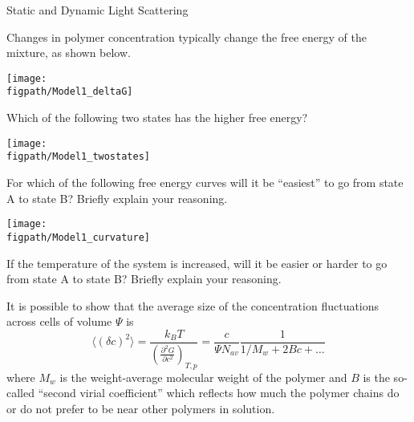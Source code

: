 \begin{activity}{Static and Dynamic Light Scattering}
\begin{model}
	\label{\labelbase:mdl:SLS}

Changes in polymer concentration typically change the free energy of the mixture, as shown below.
	
	\centerline{\texttt{[image: \\figpath/Model1\_deltaG]}}
	
\end{model}

\begin{ctqs}
	
		\question Which of the following two states has the higher free energy?
	
	\vspace{6pt}
	\centerline{\texttt{[image: \\figpath/Model1\_twostates]}}
	
			\begin{solution}[0.25in]{}
			\end{solution}
			
		\question For which of the following free energy curves will it be ``easiest'' to go from state A to state B?  Briefly explain your reasoning.  \label{\labelbase:ctq:delGcurvature}
	
	\centerline{\texttt{[image: \\figpath/Model1\_curvature]}}
	
			\begin{solution}[1in]{}
			\end{solution}
			
	\question If the temperature of the system is increased, will it be easier or harder to go from state A to state B?  Briefly explain your reasoning. \label{\labelbase:ctq:temperature}
	
			\begin{solution}[1in]{}
			\end{solution}
	
\end{ctqs}

\begin{infobox}
	It is possible to show that the average size of the concentration fluctuations across cells of volume $\Psi$ is
	\begin{equation*}
		\langle (\delta c)^2\rangle = \frac{k_BT}{\left( \frac{\partial^2 G}{\partial c^2}\right)_{T,p}} = \frac{c}{\Psi N_{av}} \frac{1}{1/M_w + 2Bc + \dots}
	\end{equation*}
	where $M_w$ is the weight-average molecular weight of the polymer and $B$ is the so-called ``second virial coefficient'' which reflects how much the polymer chains do or do not prefer to be near other polymers in solution.
\end{infobox}


\end{activity}
